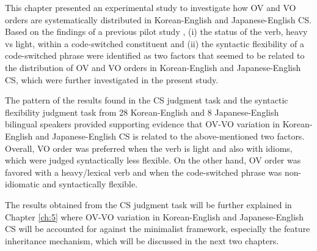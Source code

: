 This chapter presented an experimental study to investigate how \ac{OV} and \ac{VO} orders are systematically distributed in Korean-English and Japanese-English \ac{CS}. Based on the findings of a previous pilot study \citep{Shim2011}, (i) the status of the verb, heavy vs light, within a code-switched constituent and (ii) the syntactic flexibility of a code-switched phrase were identified as two factors that seemed to be related to the distribution of \ac{OV} and \ac{VO} orders in Korean-English and Japanese-English \ac{CS}, which were further investigated in the present study. 

  The pattern of the results found in the \ac{CS} judgment task and the syntactic flexibility judgment task from 28 Korean-English and 8 Japanese-English bilingual speakers provided supporting evidence that \ac{OV}-\ac{VO} variation in Korean-English and Japanese-English \ac{CS} is related to the above-mentioned two factors. Overall, \ac{VO} order was preferred when the verb is light and also with idioms, which were judged syntactically less flexible. On the other hand, \ac{OV} order was favored with a heavy/lexical verb and when the code-switched phrase was non-idiomatic and syntactically flexible. 

  The results obtained from the \ac{CS} judgment task will be further explained in Chapter \ref{ch:5} where \ac{OV}-\ac{VO} variation in Korean-English and Japanese-English \ac{CS} will be accounted for against the minimalist framework, especially the feature inheritance mechanism, which will be discussed in the next two chapters. 

